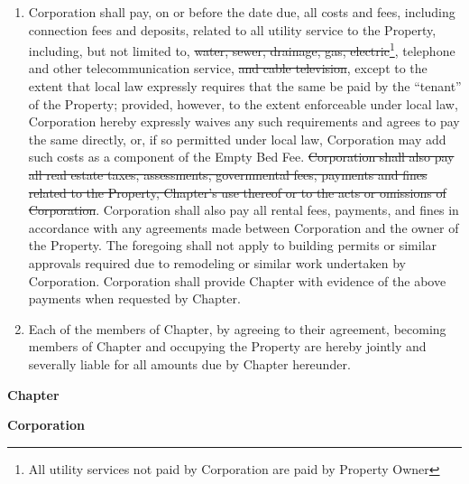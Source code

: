 \documentclass[12pt]{article}
\begin{document}
\begin{enumerate}
        \item Corporation shall pay, on or before the date due, all costs and fees, including connection fees and deposits, related to all utility service to the Property, including, but not limited to, \st{water, sewer, drainage, gas, electric}\footnote{All utility services not paid by Corporation are paid by Property Owner}, telephone and other telecommunication service, \st{and cable television}, except to the extent that local law expressly requires that the same be paid by the ``tenant'' of the Property; provided, however, to the extent enforceable under local law, Corporation hereby expressly waives any such requirements and agrees to pay the same directly, or, if so permitted under local law, Corporation may add such costs as a component of the Empty Bed Fee.
                \st{Corporation shall also pay all real estate taxes, assessments, governmental fees, payments and fines related to the Property, Chapter's use thereof or to the acts or omissions of Corporation}.
                Corporation shall also pay all rental fees, payments, and fines in accordance with any agreements made between Corporation and the owner of the Property.
                The foregoing shall not apply to building permits or similar approvals required due to remodeling or similar work undertaken by Corporation.  Corporation shall provide Chapter with evidence of the above payments when requested by Chapter.
        \item Each of the members of Chapter, by agreeing to their agreement, becoming members of Chapter and occupying the Property are hereby jointly and severally liable for all amounts due by Chapter hereunder.
\end{enumerate}

\clearpage
\textbf{\large Chapter}

\signature{President}

\signature{Risk Manager}

\signature{House Manager}

\clearpage
\textbf{\large Corporation}

\signature{President}
\end{document}
